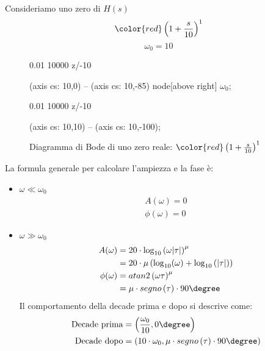 \documentclass[a4paper]{article}
\begin{document}
\noindent
Consideriamo uno zero di \( H(s) \) 
\[
  \color{red} \left( 1 + \frac{s}{10} \right)^{1}
\] 
\[
\omega_0 = 10
\] 
\begin{figure}[H]
  \centering
  \begin{BodeMagPlot}[scale=1.5,ytick distance=20,ylabel={Ampiezza (dB)},xlabel={}] {0.01} {10000}
    {
      z/-10
    }

     (axis cs: 10,0) -- (axis cs: 10,-85) node[above right] {\( \omega_0 \)};
  \end{BodeMagPlot}

  \begin{BodePhPlot}[scale=1.5,ytick distance=45,ylabel={Fase (deg)},xlabel={Frequenza (rad/s)}] {0.01} {10000}
    {
      z/-10
    }

     (axis cs: 10,10) -- (axis cs: 10,-100);
  \end{BodePhPlot}
  \caption{Diagramma di Bode di uno zero reale: \( \color{red} \left( 1 + \frac{s}{10} \right)^{1} \) }
\end{figure}

\vspace{1em}
\noindent
La formula generale per calcolare l'ampiezza e la fase è:
\begin{itemize}
  \item \( \omega \ll \omega_0 \) 
    \[
    \begin{aligned}
      A(\omega) = 0\\
      \phi(\omega) = 0
    \end{aligned}
    \] 
  \item \( \omega \gg \omega_0 \) 
    \[
    \begin{aligned}
      A(\omega) &= 20 \cdot \log_{10} \left( \omega |\tau| \right)^{\mu}\\
                &= 20 \cdot \mu \left( \log_{10} (\omega) + \log_{10} \left( \left| \tau \right|  \right)  \right) \\
      \phi(\omega) &= atan2 \left( \omega \tau \right)^{\mu}\\
                   &= \mu \cdot segno \left( \tau \right) \cdot 90\degree
    \end{aligned}
    \] 
    Il comportamento della decade prima e dopo si descrive come:
    \[
      \begin{aligned}
        \text{Decade prima} &= \left( \frac{\omega_0}{10}, 0\degree \right) \\
        \text{Decade dopo} &= \left( 10 \cdot \omega_0, \mu \cdot segno \left( \tau \right) \cdot 90\degree \right)
      \end{aligned}
    \] 
\end{itemize}
\end{document}
